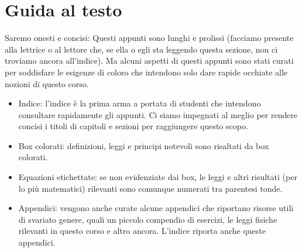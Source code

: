 \chapter*{Guida al testo}
Saremo onesti e concisi: Questi appunti sono lunghi e prolissi (facciamo presente
alla lettrice o al lettore che, se ella o egli sta leggendo questa sezione,
non ci troviamo ancora all'indice). Ma alcuni aspetti di questi appunti sono
stati curati per soddisfare le esigenze di coloro che intendono solo dare rapide
occhiate alle nozioni di questo corso.

\begin{itemize}
    \item Indice: l'indice è la prima arma a portata di studenti che intendono
    consultare rapidamente gli appunti. Ci siamo impegnati al meglio per rendere
    concisi i titoli di capitoli e sezioni per raggiungere questo scopo.

    \item Box colorati: definizioni, leggi e principi notevoli sono risaltati
    da box colorati.
    
    \item Equazioni etichettate: se non evidenziate dai box, le leggi e altri
    risultati (per lo più matematici) rilevanti sono comunque numerati tra
    parentesi tonde.

    \item Appendici: vengono anche curate alcune appendici che riportano risorse
    utili di svariato genere, quali un piccolo compendio di esercizi, le leggi
    fisiche rilevanti in questo corso e altro ancora. L'indice riporta anche
    queste appendici.
\end{itemize}